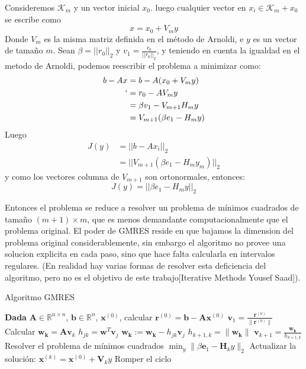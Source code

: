 \documentclass[12pt, oneside]{book}
\begin{document}
	Consideremos $\mathcal{K}_m$ y un vector inicial $x_0$. luego cualquier vector en $x_i\in\mathcal{K}_m+x_0$ se escribe como $$x=x_0+V_my$$
	Donde $V_m$ es la misma matriz definida en el método de Arnoldi, e $y$ es un vector de tamaño $m$. Sean $\beta = ||r_0||_2$ y $v_1=\frac{r_0}{||r_0||_2}$, y teniendo en cuenta la igualdad en el metodo de Arnoldi, podemos reescribir el problema a minimizar como:
	\begin{equation*}
		\begin{split}
			b-Ax&=b-A(x_0+V_my)\\
			`    &= r_0-AV_my\\
			&= \beta v_1-V_{m+1}H_my\\
			&= V_{m+1}(\beta e_1 - H_my)
		\end{split}
	\end{equation*}
	Luego 
	\begin{equation*}
		\begin{split}
			J(y)&=||b-Ax_i||_2\\
			&=||V_{m+1}(\beta e_1 - H_my_m)||_2    
		\end{split}
	\end{equation*}
	y como los vectores columna de $V_{m+1}$ son ortonormales, entonces:
	$$J(y)=||\beta e_1 - H_my||_2$$
	
	Entonces el problema se reduce a resolver un problema de mínimos cuadrados de tamaño $(m+1)\times m$, que es menos demandante computacionalmente que el problema original. El poder de GMRES reside en que bajamos la dimension del problema original considerablemente, sin embargo el algoritmo no provee una solucion explicita en cada paso, sino que hace falta calcularla en intervalos regulares. (En realidad hay varias formas de resolver esta deficiencia del algoritmo, pero no es el objetivo de este trabajo[Iterative Methods Yousef Saad]).
	\begin{algorithm}
		\caption{Algoritmo GMRES}
		\begin{algorithmic}[1]
			\STATE \textbf{Dada} $\mathbf{A} \in \mathbb{R}^{n \times n}$, $\mathbf{b} \in \mathbb{R}^n$, $\mathbf{x}^{(0)}$, calcular $\mathbf{r}^{(0)} = \mathbf{b} - \mathbf{A} \mathbf{x}^{(0)}$
			\STATE $\mathbf{v}_1 = \frac{\mathbf{r}^{(0)}}{\|\mathbf{r}^{(0)}\|}$
			\STATE Calcular $\mathbf{w_k} = \mathbf{A} \mathbf{v}_k$
			\STATE $h_{jk} = \mathbf{w}^T \mathbf{v}_j$
			\STATE $\mathbf{w_k} := \mathbf{w_k} - h_{jk} \mathbf{v}_j$
			\ENDFOR
			\STATE $h_{k+1,k} = \|\mathbf{w_k}\|$
			\STATE $\mathbf{v}_{k+1} = \frac{\mathbf{w_k}}{h_{k+1,k}}$
			\ENDIF
			\ENDFOR
			\STATE Resolver el problema de mínimos cuadrados $\min_y \|\beta \mathbf{e}_1 - \mathbf{H}_k y\|_2$
			\STATE Actualizar la solución: $\mathbf{x}^{(k)} = \mathbf{x}^{(0)} + \mathbf{V}_k y$
			\STATE Romper el ciclo
			\ENDIF
		\end{algorithmic}
	\end{algorithm}
	
	
\end{document}
